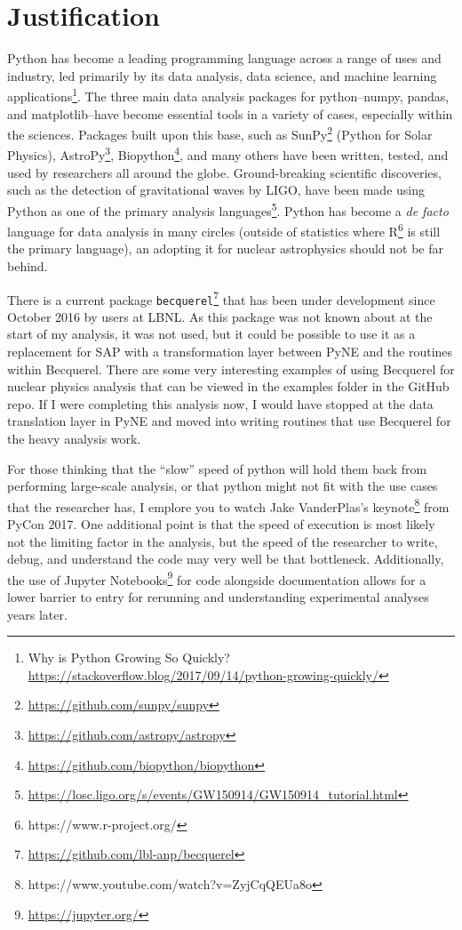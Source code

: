 \section{Justification}

Python has become a leading programming language across a range of uses
and industry, led primarily by its data analysis, data science, and
machine learning applications\footnote{Why is Python Growing So Quickly?
\url{https://stackoverflow.blog/2017/09/14/python-growing-quickly/}}.
The three main data analysis packages for python\---{}numpy, pandas, and
matplotlib\---{}have become essential tools in a variety of cases,
especially within the sciences. Packages built upon this base, such as
SunPy\footnote{\url{https://github.com/sunpy/sunpy}} (Python for Solar
Physics), AstroPy\footnote{\url{https://github.com/astropy/astropy}},
Biopython\footnote{\url{https://github.com/biopython/biopython}}, and
many others have been written, tested, and used by researchers all
around the globe. Ground-breaking scientific discoveries, such as the
detection of gravitational waves by LIGO, have been made using Python
as one of the primary analysis
languages\footnote{\url{https://losc.ligo.org/s/events/GW150914/GW150914_tutorial.html}}.
Python has become a \emph{de facto} language for data analysis in many
circles (outside of statistics where
R\footnote{https://www.r-project.org/} is still the primary language),
an adopting it for nuclear astrophysics should not be far behind.

There is a current package
\verb+becquerel+\footnote{\url{https://github.com/lbl-anp/becquerel}}
that has been under development since October 2016 by users at LBNL. As
this package was not known about at the start of my analysis, it was not
used, but it could be possible to use it as a replacement for SAP with
a transformation layer between PyNE and the routines within Becquerel.
There are some very interesting examples of using Becquerel for nuclear
physics analysis that can be viewed in the examples folder in the GitHub
repo. If I were completing this analysis now, I would have stopped at
the data translation layer in PyNE and moved into writing routines that
use Becquerel for the heavy analysis work.

For those thinking that the ``slow'' speed of python will hold them back
from performing large-scale analysis, or that python might not fit with
the use cases that the researcher has, I emplore you to watch Jake
VanderPlas's
keynote\footnote{https://www.youtube.com/watch?v=ZyjCqQEUa8o} from PyCon
2017. One additional point is that the speed of execution is most likely
not the limiting factor in the analysis, but the speed of the researcher
to write, debug, and understand the code may very well be that
bottleneck. Additionally, the use of Jupyter
Notebooks\footnote{\url{https://jupyter.org/}} for code alongside
documentation allows for a lower barrier to entry for rerunning and
understanding experimental analyses years later.

